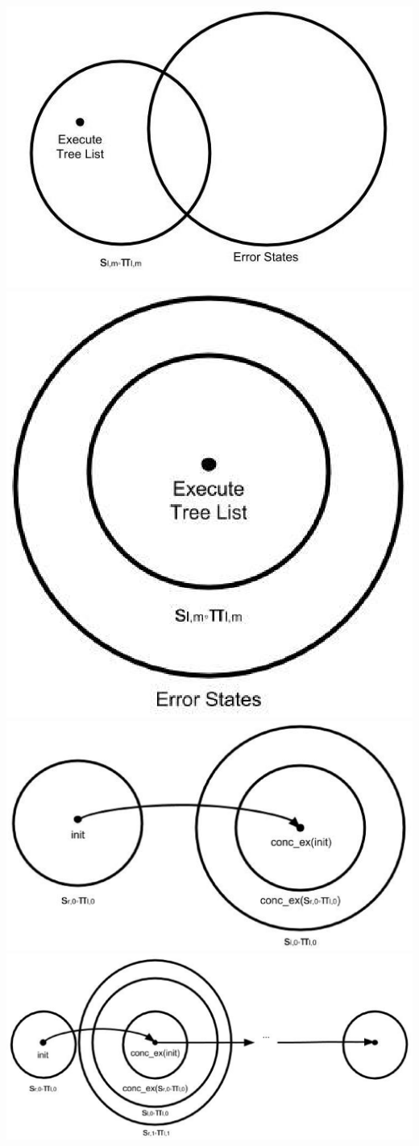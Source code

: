 \includegraphics[width=.5\textwidth]{set1.eps}\\
\includegraphics[width=.5\textwidth]{set2.eps}\\
\includegraphics[width=.5\textwidth]{set3.eps}\\
\includegraphics[width=.8\textwidth]{set4.eps}